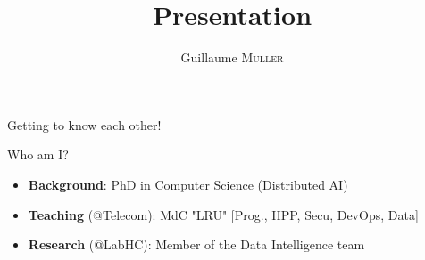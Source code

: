 \documentclass[English,t,%
hyperref={%
    pdftitle={GM's Introduction},%
    pdfauthor={Guillaume Muller},%
    pdfsubject={GM's Introduction},%
    pdfkeywords={Presentation, Introduction}%
    },%
xcolor={pdftex,svgnames} %
]{beamer}
\def\me{Guillaume \textsc{Muller}}
\begin{document}
\title{Presentation}
\author{\me}

\begin{frame}
  \maketitle
\end{frame}


\begin{frame}{Getting to know each other!}

\vspace{-.5cm}
%
  \begin{block}{Who am I?}
    { \footnotesize
      \begin{itemize}
        \item \textbf{Background}: PhD in Computer Science (Distributed AI)
        \item \textbf{Teaching} (@Telecom): MdC "LRU" [Prog., HPP, Secu, DevOps, Data]
        \item \textbf{Research} (@LabHC): Member of the Data Intelligence team
      \end{itemize}
    }
  \end{block}


\end{frame}
\end{document}

